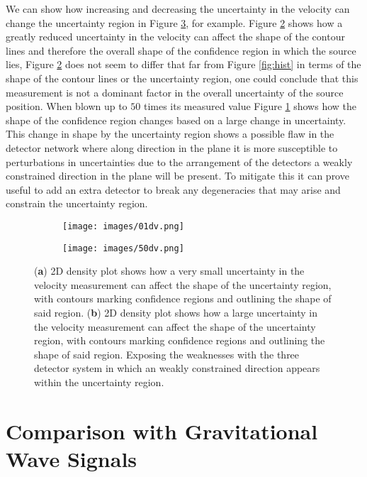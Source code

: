 We can show how increasing and decreasing the uncertainty in the velocity can change the uncertainty region in Figure \ref{fig:unc-change}, for example. Figure \ref{fig:det-01dv} shows how a greatly reduced uncertainty in the velocity can affect the shape of the contour lines and therefore the overall shape of the confidence region in which the source lies, Figure \ref{fig:det-01dv} does not seem to differ that far from Figure \ref{fig:hist} in terms of the shape of the contour lines or the uncertainty region, one could conclude that this measurement is not a dominant factor in the overall uncertainty of the source position. When blown up to $50$ times its measured value Figure \ref{fig:50dv} shows how the shape of the confidence region changes based on a large change in uncertainty. This change in shape by the uncertainty region shows a possible flaw in the detector network where along direction in the plane it is more susceptible to perturbations in uncertainties due to the arrangement of the detectors a weakly constrained direction in the plane will be present. To mitigate this it can prove useful to add an extra detector to break any degeneracies that may arise and constrain the uncertainty region.

\begin{figure}[h!]
    \centering
    \begin{subfigure}[b]{.47\textwidth}
      \centering
      \texttt{[image: images/01dv.png]}
      \caption{}
      \label{fig:50dv}
    \end{subfigure}%
    \begin{subfigure}[b]{.53\textwidth}
      \centering
      \texttt{[image: images/50dv.png]}
      \caption{}
      \label{fig:det-01dv}
    \end{subfigure}
    \caption{(\textbf{a}) 2D density plot shows how a very small uncertainty in the velocity measurement can affect the shape of the uncertainty region, with contours marking confidence regions and outlining the shape of said region. (\textbf{b}) 2D density plot shows how a large uncertainty in the velocity measurement can affect the shape of the uncertainty region, with contours marking confidence regions and outlining the shape of said region. Exposing the weaknesses with the three detector system in which an weakly constrained direction appears within the uncertainty region.}
    \label{fig:unc-change}
\end{figure}

\section{Comparison with Gravitational Wave Signals}


